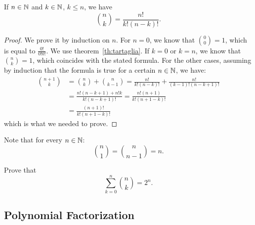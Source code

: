   \begin{theorem}
  \mymark{***}%
  If $n\in {\mathbb N}$ and $k\in {\mathbb N}$, $k\le n$,
  we have 
  \[
  {n \choose k}  
  = \frac{n!}{k!(n-k)!}.  
  \]
  \end{theorem}
  \begin{proof}
  We prove it by induction on $n$.
  For $n=0$, we know that ${0 \choose 0} = 1$, which 
  is equal to $\frac{0!}{0!0!}$.
  We use theorem~\ref{th:tartaglia}.
  If $k=0$ or $k=n$, we know that ${n \choose k}=1$, which coincides 
  with the stated formula. 
  For the other cases, assuming by induction that the formula is 
  true for a certain $n\in {\mathbb N}$, we have: 
  \begin{align*}
   {n+1 \choose k} 
   &= {n \choose k} + {n \choose k-1}
   =  \frac{n!}{k!(n-k)!} + \frac{n!}{(k-1)!(n-k+1)!} \\
   &= \frac{n!(n-k+1) + n! k}{k!(n-k+1)!}
   = \frac{n!(n+1)}{k!(n+1-k)!} \\
   &= \frac{(n+1)!}{k!(n+1-k)!}
  \end{align*}
  which is what we needed to prove.
\end{proof}

Note that for every $n\in {\mathbb N}$:
\[
  {n \choose 1} = {n \choose n-1} = n.
\]
  
\begin{exercise}
  Prove that
  \[
   \sum_{k=0}^n {n \choose k} = 2^n.
  \]
\end{exercise}  


\subsection{Polynomial Factorization}

